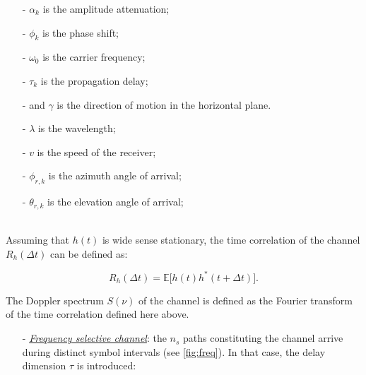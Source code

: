 \documentclass [a4paper, 11pt] {article}
\begin{document}
\begin{reminder}
\begin{enumerate}
\begin{itemize}
        \begin{minipage}[t]{0.45\textwidth}
            \begin{itemize}
            \item[-] $\alpha_k$ is the amplitude attenuation;
            \item[-] $\phi_k$ is the phase shift;
            \item[-] $\omega_0$ is the carrier frequency;
            \item[-] $\tau_k$ is the propagation delay;
            \item[-] and $\gamma$ is the direction of motion in the horizontal plane.
        \end{itemize}
        \end{minipage}
        \hfill
        \begin{minipage}[t]{0.45\textwidth}
            \begin{itemize}
            \item[-] $\lambda$ is the wavelength;
            \item[-] $v$ is the speed of the receiver;
            \item[-] $\phi_{r,k}$ is the azimuth angle of arrival;
            \item[-] $\theta_{r,k}$ is the elevation angle of arrival;
        \end{itemize}
        \end{minipage}\\
        
        Assuming that $h(t)$ is wide sense stationary, the time correlation of the channel $R_h(\Delta t)$ can be defined as: 
        
                \begin{equation}
                R_h(\Delta t) = \mathbb{E}\Big[h(t)h^*(t+\Delta t)\Big].
                \end{equation}
        
        The Doppler spectrum $S(\nu)$ of the channel is defined as the Fourier transform of the time correlation defined here above. 
        
        \end{itemize}
        \end{enumerate}
        
        \begin{itemize}
        
        \item[-] \underline{\textit{Frequency selective channel}}: the $n_s$ paths constituting the channel arrive during distinct symbol intervals (see \autoref{fig:freq}). In that case, the delay dimension $\tau$ is introduced: 
        

\end{itemize}
\end{reminder}
\end{document}
